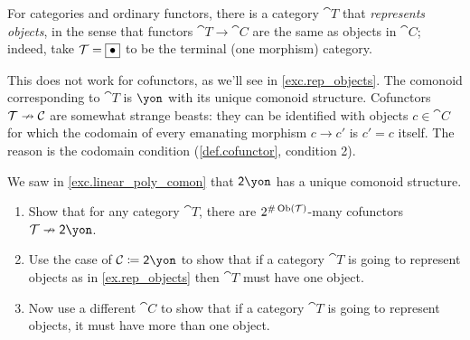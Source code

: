 \documentclass[Book-Poly]{subfiles}
\begin{document}
\begin{example}\label{ex.rep_objects}
For categories and ordinary functors, there is a category $\cat{T}$ that \emph{represents objects}, in the sense that functors $\cat{T}\to\cat{C}$ are the same as objects in $\cat{C}$; indeed, take $\mathcal{T}=\fbox{$\bullet$}$ to be the terminal (one morphism) category.

This does not work for cofunctors, as we'll see in \cref{exc.rep_objects}. The comonoid corresponding to $\cat{T}$ is $\yon$ with its unique comonoid structure. Cofunctors $\mathcal{T}\nrightarrow\mathcal{C}$ are somewhat strange beasts: they can be identified with objects $c\in\cat{C}$ for which the codomain of every emanating morphism $c\to c'$ is $c'=c$ itself. The reason is the codomain condition (\cref{def.cofunctor}, condition 2).
\end{example}

\begin{exercise}\label{exc.rep_objects}
We saw in \cref{exc.linear_poly_comon} that $\2\yon$ has a unique comonoid structure.
\begin{enumerate}
	\item Show that for any category $\cat{T}$, there are $2^{\#\operatorname{Ob}(\mathcal{T})}$-many cofunctors $\cat{T}\cof\2\yon$.
	\item Use the case of $\cat{C}\coloneqq\2\yon$ to show that if a category $\cat{T}$ is going to represent objects as in \cref{ex.rep_objects} then $\cat{T}$ must have one object.
	\item Now use a different $\cat{C}$ to show that if a category $\cat{T}$ is going to represent objects, it must have more than one object.
\qedhere
\end{enumerate}
\end{exercise}
\end{document}
